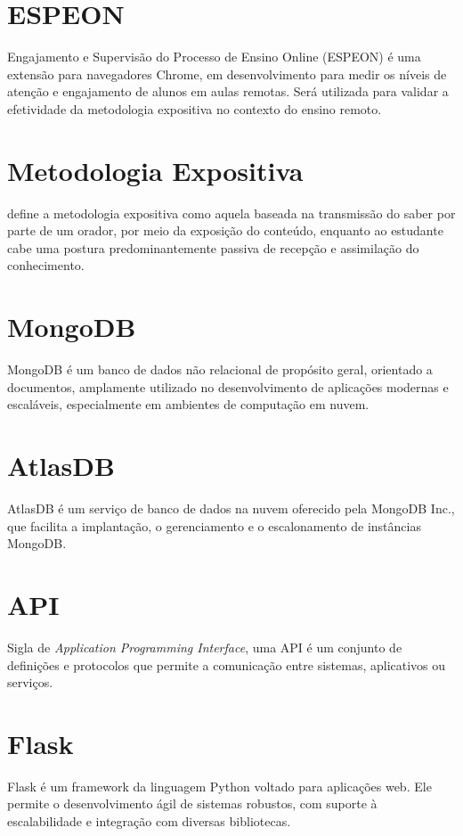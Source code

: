 \section{ESPEON}
Engajamento e Supervisão do Processo de Ensino Online (ESPEON) é uma extensão para navegadores Chrome, em desenvolvimento para medir os níveis de atenção e engajamento de alunos em aulas remotas. Será utilizada para validar a efetividade da metodologia expositiva no contexto do ensino remoto.

\section{Metodologia Expositiva}
 define a metodologia expositiva como aquela baseada na transmissão do saber por parte de um orador, por meio da exposição do conteúdo, enquanto ao estudante cabe uma postura predominantemente passiva de recepção e assimilação do conhecimento. 

\section{MongoDB}
MongoDB é um banco de dados não relacional de propósito geral, orientado a documentos, amplamente utilizado no desenvolvimento de aplicações modernas e escaláveis, especialmente em ambientes de computação em nuvem.

\section{AtlasDB}
AtlasDB é um serviço de banco de dados na nuvem oferecido pela MongoDB Inc., que facilita a implantação, o gerenciamento e o escalonamento de instâncias MongoDB.

\section{API}
Sigla de \textit{Application Programming Interface}, uma API é um conjunto de definições e protocolos que permite a comunicação entre sistemas, aplicativos ou serviços.

\section{Flask}
Flask é um framework da linguagem Python voltado para aplicações web. Ele permite o desenvolvimento ágil de sistemas robustos, com suporte à escalabilidade e integração com diversas bibliotecas.

